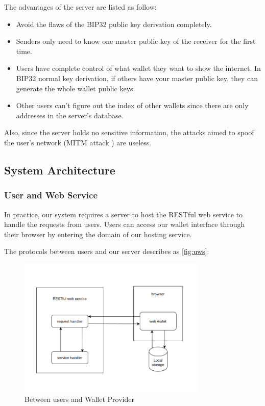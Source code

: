 The advantages of the server are listed as follow:

\begin{itemize}
    \item Avoid the flaws of the BIP32 public key derivation completely.
    \item Senders only need to know one master public key of the receiver for the first time.
    \item Users have complete control of what wallet they want to show the internet. In BIP32 normal key derivation, if others have your master public key, they can generate the whole wallet public keys.
    \item Other users can't figure out the index of other wallets since there are only addresses in the server's database.
\end{itemize}

Also, since the server holds no sensitive information, the attacks aimed to spoof the user’s network (MITM attack \cite{mitm}) are useless.



\subsection{System Architecture}
\label{system_architect}

\subsubsection{User and Web Service}

In practice, our system requires a server to host the RESTful web service to handle the requests from users. Users can access our wallet interface through their browser by entering the domain of our hosting service.

The protocols between users and our server describes as \autoref{fig:uws}:

\begin{figure}[!ht]
    \centering
    \includegraphics[width=0.8\textwidth]{images/design_uws.png}
    \caption[Between users and Wallet Provider]{Between users and Wallet Provider}
    \label{fig:uws}
\end{figure}

